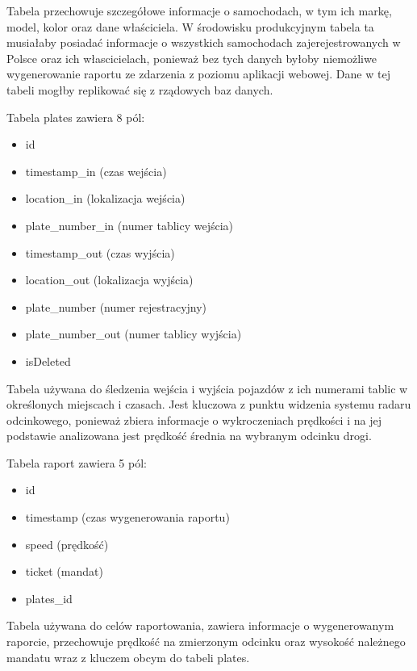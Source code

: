 \documentclass[12pt,a4paper,oneside]{article}
\theoremstyle{definition}
\numberwithin{equation}{section}
\begin{document}
        Tabela przechowuje szczegółowe informacje o samochodach, w tym ich markę, model, kolor oraz dane właściciela. W środowisku produkcyjnym tabela ta musiałaby posiadać informacje o wszystkich samochodach zajerejestrowanych w Polsce oraz ich włascicielach, ponieważ bez tych danych byłoby niemożliwe wygenerowanie raportu ze zdarzenia z poziomu aplikacji webowej. Dane w tej tabeli mogłby replikować się z rządowych baz danych.  

    Tabela plates zawiera 8 pól:
    
    \begin{itemize}
      \item id
      \item timestamp{\_}in (czas wejścia)
      \item location{\_}in (lokalizacja wejścia)
      \item plate{\_}number{\_}in (numer tablicy wejścia)
      \item timestamp{\_}out (czas wyjścia)
      \item location{\_}out (lokalizacja wyjścia) 
      \item plate{\_}number (numer rejestracyjny)
      \item plate{\_}number{\_}out (numer tablicy wyjścia)
      \item isDeleted 

   \end{itemize}
        
        Tabela używana do śledzenia wejścia i wyjścia pojazdów z ich numerami tablic w określonych miejscach i czasach. Jest kluczowa z punktu widzenia systemu radaru odcinkowego, ponieważ zbiera informacje o wykroczeniach prędkości i na jej podstawie analizowana jest prędkość średnia na wybranym odcinku drogi. 

    Tabela raport zawiera 5 pól:
    \begin{itemize}
      \item id
      \item timestamp (czas wygenerowania raportu)
      \item speed (prędkość)
      \item ticket (mandat)
      \item plates{\_}id
   \end{itemize}
        
        
        Tabela używana do celów raportowania, zawiera informacje o wygenerowanym raporcie, przechowuje prędkość na zmierzonym odcinku oraz wysokość należnego mandatu wraz z kluczem obcym do tabeli plates.
\end{document}
